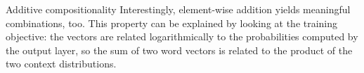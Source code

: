\documentclass[serif, xcolor={svgnames, table}, usepdftitle=false]{beamer}
\begin{document}
\begin{frame}{Additive compositionality}
  Interestingly, element-wise addition yields meaningful combinations, too.
  This property can be explained by looking at the training objective: the
  vectors are related logarithmically to the probabilities computed by the
  output layer, so the sum of two word vectors is related to the product of the
  two context distributions.
  \begin{table}
    \centering
    \caption{Additive compositionality showing the \num{4} closest vectors.}
  \end{table}
\end{frame}
\end{document}
